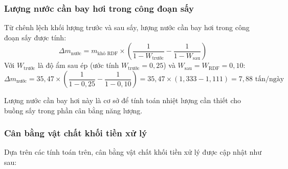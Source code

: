 \documentclass[../main.tex]{subfiles}
\begin{document}
\subsubsection{Lượng nước cần bay hơi trong công đoạn sấy}

Từ chênh lệch khối lượng trước và sau sấy, lượng nước cần bay hơi trong công đoạn sấy được tính:
\begin{equation}
  \Delta m_{\text{nước}} = m_{\text{khô RDF}} \times \left( \frac{1}{1-W_{\text{trước}}} - \frac{1}{1-W_{\text{sau}}} \right)
  \label{eq:nuoc-can-bay-hoi}
\end{equation}
Với $W_{\text{trước}}$ là độ ẩm sau ép (ước tính $W_{\text{trước}} = 0{,}25$) và $W_{\text{sau}} = W_{\text{RDF}} = 0{,}10$:
\begin{equation}
  \Delta m_{\text{nước}} = 35{,}47 \times \left( \frac{1}{1-0{,}25} - \frac{1}{1-0{,}10} \right) = 35{,}47 \times (1{,}333 - 1{,}111) = 7{,}88 \text{ tấn/ngày}
\end{equation}

Lượng nước cần bay hơi này là cơ sở để tính toán nhiệt lượng cần thiết cho buồng sấy trong phần cân bằng năng lượng.

\subsubsection{Cân bằng vật chất khối tiền xử lý}

Dựa trên các tính toán trên, cân bằng vật chất khối tiền xử lý được cập nhật như sau:

\begin{table}[htbp]
\caption{Cân bằng vật chất khối tiền xử lý cho $G_0 = 120$ tấn CTRSH/ngày đêm}
\label{tab:can-bang-rdf-120}
\centering
\setlength{\tabcolsep}{5pt}
\end{table}
\end{document}
